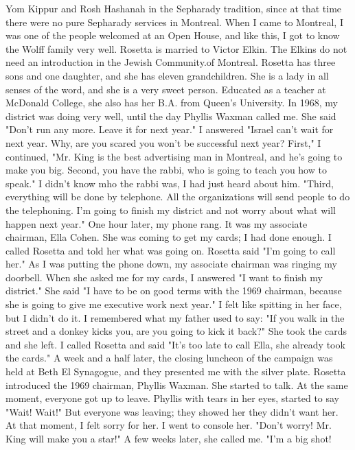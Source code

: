 Yom Kippur and Rosh Hashanah in the Sepharady tradition, since at that time 
there were no pure Sepharady services in Montreal.
When I came to Montreal, 
I was one of the people welcomed at an Open House, and like this, I got to 
know the Wolff family very well.
Rosetta is married to Victor Elkin.
The Elkins do not need an introduction in the Jewish Community.of Montreal.
Rosetta has three sons and 
one daughter, and she has eleven grandchildren.
She is a lady in all senses of the word, and she is a very sweet person.
Educated as a teacher at 
McDonald College, she also has her B.A.
from Queen's University.
In 1968, my district was doing very well, until the day Phyllis Waxman called me.
She said "Don't run any more.
Leave it for next year."
I answered "Israel can't wait for next year.
Why, are 
you scared you won't be successful next year?
First," I continued, "Mr.
King is the best advertising man in Montreal, and he's going to make you 
big.
Second, you have the rabbi, who is going to teach you how to speak."
I didn't know mho the rabbi was, I had just heard about him.
"Third, 
everything will be done by telephone.
All the organizations will send people to do the telephoning.
I'm going to finish my district and not worry about what will happen next year."
One hour later, my phone rang.
It was my associate chairman, Ella Cohen.
She was coming to get my cards; I had done enough.
I called Rosetta and told her what was going on.
Rosetta said "I'm going to call her."
As I was putting the phone down, my associate chairman was ringing my doorbell.
When she asked me for my cards, I answered "I want to finish my district."
She said "I have to be on good terms with the 1969 chairman, because she is going to give me executive work next year."
I felt like spitting in her face, but I didn't do it.
I remembered what my father used to 
say: "If you walk in the street and a donkey kicks you, are you going to 
kick it back?"
She took the cards and she left.
I called Rosetta and said "It's too late to call Ella, she already 
took the cards."
A week and a half later, the closing luncheon of the campaign was held at Beth El Synagogue, and they presented me with the silver 
plate.
Rosetta introduced the 1969 chairman, Phyllis Waxman.
She started to talk.
At the same moment, everyone got up to leave.
Phyllis with 
tears in her eyes, started to say "Wait!
Wait!"
But everyone was leaving; 
they showed her they didn't want her.
At that moment, I felt sorry for her.
I went to console her.
"Don't worry!
Mr.
King will make you a star!"
A few weeks later, she called me.
"I'm a big shot!
